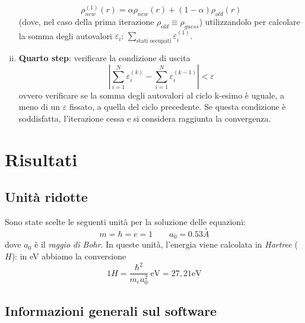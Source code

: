 \documentclass[11pt,a4paper]{article}
\begin{document}
\begin{enumerate}[i.]
\begin{equation}
\rho_{new}^{(1)}(r) = \alpha \rho_{new}(r) + (1-\alpha)\rho_{old}(r)
\end{equation}
(dove, nel caso della prima iterazione $\rho_{old} \equiv \rho_{guess}$) utilizzandolo per calcolare la somma degli autovalori $\varepsilon_i$: $\sum_{\text{stati occupati}} \varepsilon_i^{(1)}$.
\item \textbf{Quarto step}: verificare la condizione di uscita
\begin{equation}
\left| \sum_{i=1}^N \varepsilon_i^{(k)} - \sum_{i=1}^N \varepsilon_i^{(k-1)} \right| < \varepsilon
\end{equation}
ovvero verificare se la somma degli autovalori al ciclo k-esimo è uguale, a meno di un $\varepsilon$ fissato, a quella del ciclo precedente. Se questa condizione è soddisfatta, l'iterazione cessa e si considera raggiunta la convergenza. 
\end{enumerate}

\section{Risultati}
\subsection{Unità ridotte}
Sono state scelte le seguenti unità per la soluzione delle equazioni: 
\[
m = \hbar = e = 1 \qquad a_0 = 0.53 \overset{\circ}{A}
\]
dove $a_0$ è il \emph{raggio di Bohr}. In queste unità, l'energia viene calcolata in \emph{Hartree} ($H$): in eV abbiamo la conversione
\begin{equation}
1 H = \frac{\hbar^2}{m_e a_0^2} \ \text{eV} = 27,21 \text{eV}
\end{equation}  
\subsection{Informazioni generali sul software}
\end{document}
